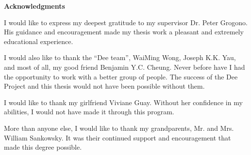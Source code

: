 
\begin{center}
{\bf Acknowledgments}
\end{center}


I would like to express my deepest gratitude to my supervisor Dr.
Peter Grogono.  His guidance and encouragement made my thesis work
a pleasant and extremely educational experience.

I would also like to thank the ``Dee team'', WaiMing Wong, Joseph K.K.
Yau, and most of all, my good friend Benjamin Y.C. Cheung.  Never before
have I had the opportunity to work with a better group of people.  The
success of the Dee Project and this thesis would not have been
possible without them.

I would like to thank my girlfriend Viviane Guay.  Without her
confidence in my abilities, I would not have made it through this
program.

More than anyone else, I would like to thank my grandparents, Mr.  and
Mrs. William Sankowsky.  It was their continued support and
encouragement that made this degree possible.
